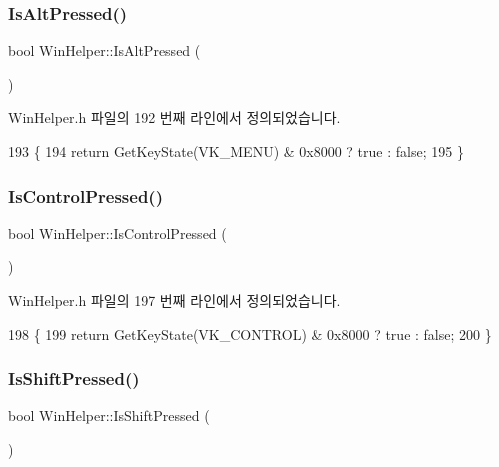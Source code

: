 \subsubsection{\texorpdfstring{Is\+Alt\+Pressed()}{IsAltPressed()}}
{\footnotesize\ttfamily bool Win\+Helper\+::\+Is\+Alt\+Pressed (\begin{DoxyParamCaption}{ }\end{DoxyParamCaption})\hspace{0.3cm}{\ttfamily [inline]}}



Win\+Helper.\+h 파일의 192 번째 라인에서 정의되었습니다.


\begin{DoxyCode}
193     \{
194       \textcolor{keywordflow}{return} GetKeyState(VK\_MENU) & 0x8000 ? true : \textcolor{keyword}{false};
195     \}
\end{DoxyCode}
\mbox{\label{namespace_win_helper_a0bf0eb5c03232357051e8b4c552a5792}} 
\subsubsection{\texorpdfstring{Is\+Control\+Pressed()}{IsControlPressed()}}
{\footnotesize\ttfamily bool Win\+Helper\+::\+Is\+Control\+Pressed (\begin{DoxyParamCaption}{ }\end{DoxyParamCaption})\hspace{0.3cm}{\ttfamily [inline]}}



Win\+Helper.\+h 파일의 197 번째 라인에서 정의되었습니다.


\begin{DoxyCode}
198     \{
199       \textcolor{keywordflow}{return} GetKeyState(VK\_CONTROL) & 0x8000 ? true : \textcolor{keyword}{false};
200     \}
\end{DoxyCode}
\mbox{\label{namespace_win_helper_aacb2f91c6ca28b7a5b4b87e52cc2ab9f}} 
\subsubsection{\texorpdfstring{Is\+Shift\+Pressed()}{IsShiftPressed()}}
{\footnotesize\ttfamily bool Win\+Helper\+::\+Is\+Shift\+Pressed (\begin{DoxyParamCaption}{ }\end{DoxyParamCaption})\hspace{0.3cm}{\ttfamily [inline]}}



